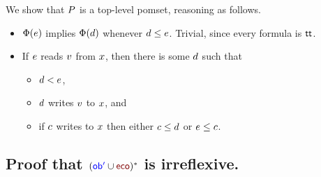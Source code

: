 We show that $P$ is a top-level pomset, reasoning as follows.
\begin{itemize}

\item $\Phi(e)$ implies $\Phi(d)$ whenever
  $d\le e$.   Trivial, since every formula is $\mathsf{tt}$.

\item If $e$ reads $v$ from $x$, then there is some $d$ such that
  \begin{itemize}
  \item $d < e$,  
  \item $d$ writes $v$ to $x$, and
  \item if $c$ writes to $x$
    then either $c \leq d$ or $e \leq c$.
  \end{itemize}    
\end{itemize}

\subsection{Proof that  $({\robi} \cup {\reco})^*$ is irreflexive. }

